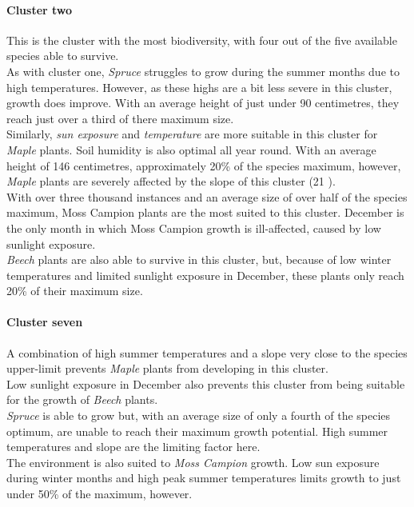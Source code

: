\paragraph{Cluster two}

This is the cluster with the most biodiversity, with four out of the five available species able to survive.\\
As with cluster one, \textit{Spruce} struggles to grow during the summer months due to high temperatures. However, as these highs are a bit less severe in this cluster, growth does improve. With an average height of just under 90 centimetres, they reach just over a third of there maximum size.\\
Similarly, \textit{sun exposure} and \textit{temperature} are more suitable in this cluster for \textit{Maple} plants. Soil humidity is also optimal all year round. With an average height of 146 centimetres, approximately 20\% of the species maximum, however, \textit{Maple} plants are severely affected by the slope of this cluster (21 \textdegree).\\
With over three thousand instances and an average size of over half of the species maximum, Moss Campion plants are the most suited to this cluster. December is the only month in which Moss Campion growth is ill-affected, caused by low sunlight exposure.\\
\textit{Beech} plants are also able to survive in this cluster, but, because of low winter temperatures and limited sunlight exposure in December, these plants only reach 20\% of their maximum size.

\paragraph{Cluster seven}

A combination of high summer temperatures and a slope very close to the species upper-limit prevents \textit{Maple} plants from developing in this cluster.\\
Low sunlight exposure in December also prevents this cluster from being suitable for the growth of \textit{Beech} plants.\\
\textit{Spruce} is able to grow but, with an average size of only a fourth of the species optimum, are unable to reach their maximum growth potential. High summer temperatures and slope are the limiting factor here.\\
The environment is also suited to \textit{Moss Campion} growth. Low sun exposure during winter months and high peak summer temperatures limits growth to just under 50\% of the maximum, however.\\

